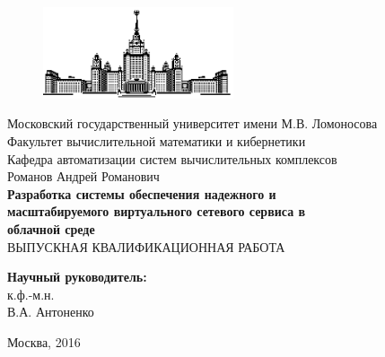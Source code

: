 \documentclass[oneside,final,14pt,a4paper]{extreport}
\begin{document}
\def\contentsname{Содержание} %





\thispagestyle{empty}
\begin{titlepage}

\begin{figure}
	\centering
	\includegraphics[width=0.5\textwidth]{msu}\\
\end{figure}

\begin{spacing}{1.0} %
\begin{center} %
	{\small
		Московский государственный университет имени М.В. Ломоносова \\
		Факультет вычислительной математики и кибернетики \\
		Кафедра автоматизации систем вычислительных комплексов \\
	}
	\vspace{4cm}
	{\large Романов Андрей Романович \\}
	\vspace{1cm}
	{\large\bfseries
		Разработка системы обеспечения надежного и \\
		масштабируемого 	виртуального сетевого сервиса в \\
		облачной среде \\
	}
	\vspace{1cm}
	ВЫПУСКНАЯ КВАЛИФИКАЦИОННАЯ  РАБОТА
\end{center}
\vfill
\begin{flushright}
\begin{small}
	{\bfseries Научный руководитель: \\}
	к.ф.-м.н. \\
	В.А. Антоненко \\
\end{small}
\end{flushright}

\vfill

\centerline{Москва, 2016}
\end{spacing}
\end{titlepage}
\setcounter{page}{2}
\end{document}
